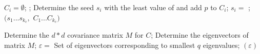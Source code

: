 \documentclass[english]{scrartcl}
\begin{document}
\begin{algorithm}
\begin{algorithmic}
        $C_i = \emptyset$;
   \EndFor
            ;
        \EndFor
        Determine the seed $s_i$ with the least value of  and add $p$ to $C_i$;
   \EndFor
        $s_i =$ ;
   \EndFor
   \Return $(s_1...s_{k_c},$ $C_1...C_{k_c})$
\EndFunction
\end{algorithmic}
\end{algorithm}

\begin{algorithm}
\begin{algorithmic}
    \State Determine the $d*d$ covariance matrix $M$ for $C$;
    \State Determine the eigenvectors of matrix $M$;
    \State $\varepsilon =$ Set of eigenvectors corresponding  to smallest $q$ eigenvalues;
    \State \Return $(\varepsilon)$
\EndFunction
\end{algorithmic}
\end{algorithm}
\end{document}
